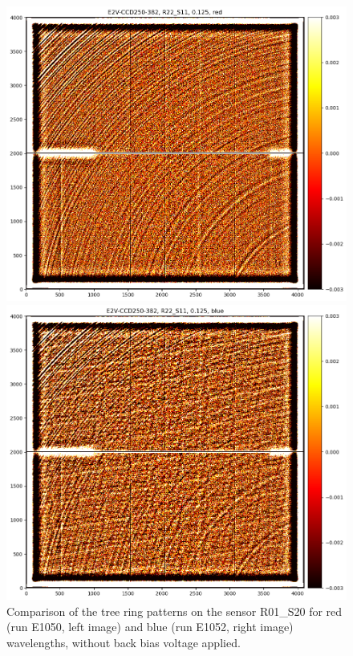 \begin{figure}[ht]
\centering
\begin{minipage}[b]{0.45\textwidth}
\centering
\includegraphics[width=\textwidth]{figures/R22_S11_red.png}
\end{minipage}
\begin{minipage}[b]{0.45\textwidth}
\centering
\includegraphics[width=\textwidth]{figures/R22_S11_blue.png}
\end{minipage}
\caption{Comparison of the tree ring patterns on the sensor R01\_S20 for red (run E1050, left image) and blue (run E1052, right image) wavelengths, without back bias voltage applied.}
\label{fig:tree_ring_wavelength_dep}
\end{figure}

